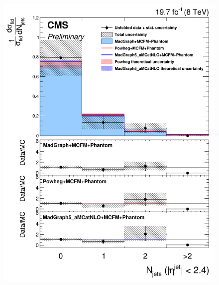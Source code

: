 \begin{figure}[hbtp]
\begin{center}
    \includegraphics[width=\cmsFigWidth]{Figures/DiffCrossSecZZTo4eCentralJets_Unfolded_fr_MadGraph_norm.png}     

\end{center}
\end{figure}

